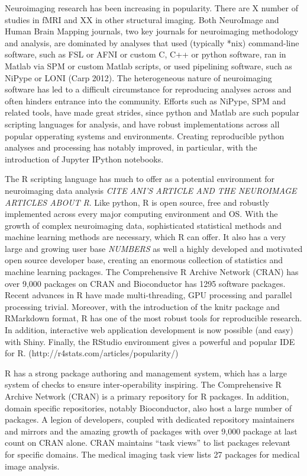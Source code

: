\documentclass[]{elsarticle} %
\begin{document}
Neuroimaging research has been increasing in popularity. There are X
number of studies in fMRI and XX in other structural imaging. Both
NeuroImage and Human Brain Mapping journals, two key journals for
neuroimaging methodology and analysis, are dominated by analyses that
used (typically *nix) command-line software, such as FSL or AFNI or
custom C, C++ or python software, ran in Matlab via SPM or custom Matlab
scripts, or used pipelining software, such as NiPype or LONI (Carp
2012). The heterogeneous nature of neuroimaging software has led to a
difficult circumstance for reproducing analyses across and often hinders
entrance into the community. Efforts such as NiPype, SPM and related
tools, have made great strides, since python and Matlab are such popular
scripting languages for analysis, and have robust implementations across
all popular opperating systems and environments. Creating reproducible
python analyses and processing has notably improved, in particular, with
the introduction of Jupyter IPython notebooks.

The R scripting language has much to offer as a potential environment
for neuroimaging data analysis \emph{CITE ANI'S ARTICLE AND THE
NEUROIMAGE ARTICLES ABOUT R}. Like python, R is open source, free and
robustly implemented across every major computing environment and OS.
With the growth of complex neuroimaging data, sophisticated statistical
methods and machine learning methods are necessary, which R can offer.
It also has a very large and growing user base \emph{NUMBERS} as well a
highly developed and motivated open source developer base, creating an
enormous collection of statistics and machine learning packages. The
Comprehensive R Archive Network (CRAN) has over 9,000 packages on CRAN
and Bioconductor has 1295 software packages. Recent advances in R have
made multi-threading, GPU processing and parallel processing trivial.
Moreover, with the introduction of the knitr package and RMarkdown
format, R has one of the most robust tools for reproducible research. In
addition, interactive web application development is now possible (and
easy) with Shiny. Finally, the RStudio environment gives a powerful and
popular IDE for R. (http://r4stats.com/articles/popularity/)

R has a strong package authoring and management system, which has a
large system of checks to ensure inter-operability inspiring. The
Comprehensive R Archive Network (CRAN) is a primary repository for R
packages. In addition, domain specific repositories, notably
Bioconductor, also host a large number of packages. A legion of
developers, coupled with dedicated repository maintainers and mirrors
and the amazing growth of packages with over 9,000 package at last count
on CRAN alone. CRAN maintains ``task views'' to list packages relevant
for specific domains. The medical imaging task view lists 27 packages
for medical image analysis.
\end{document}
